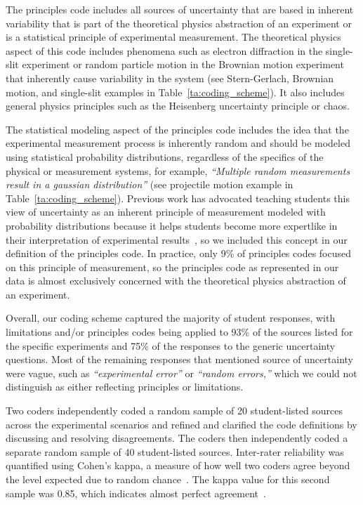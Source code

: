 \documentclass[english,aps,prstper,reprint,showpacs,longbibliography,superscriptaddress,nofootinbib]{revtex4-2}
\begin{document}
The principles code includes all sources of uncertainty that are based in inherent variability that is part of the theoretical physics abstraction of an experiment or is a statistical principle of experimental measurement. The theoretical physics aspect of this code includes phenomena such as electron diffraction in the single-slit experiment or random particle motion in the Brownian motion experiment that inherently cause variability in the system (see Stern-Gerlach, Brownian motion, and single-slit examples in Table~\ref{ta:coding_scheme}). It also includes general physics principles such as the Heisenberg uncertainty principle or chaos. 

The statistical modeling aspect of the principles code includes the idea that the experimental measurement process is inherently random and should be modeled using statistical probability distributions, regardless of the specifics of the physical or measurement systems, for example, \textit{``Multiple random measurements result in a gaussian distribution''} (see projectile motion example in Table~\ref{ta:coding_scheme}). Previous work has advocated teaching students this view of uncertainty as an inherent principle of measurement modeled with probability distributions because it helps students become more expertlike in their interpretation of experimental results~\cite{Evangelinos1999,Evangelinos2002,Allie2003,Pillay2008,Buffler2008}, so we included this concept in our definition of the principles code. In practice, only 9\% of principles codes focused on this principle of measurement, so the principles code as represented in our data is almost exclusively concerned with the theoretical physics abstraction of an experiment.

Overall, our coding scheme captured the majority of student responses, with limitations and/or principles codes being applied to 93\% of the sources listed for the specific experiments and 75\% of the responses to the generic uncertainty questions. Most of the remaining responses that mentioned source of uncertainty were vague, such as \textit{``experimental error''} or \textit{``random errors,''} which we could not distinguish as either reflecting principles or limitations. 

Two coders independently coded a random sample of 20 student-listed sources across the experimental scenarios and refined and clarified the code definitions by discussing and resolving disagreements. The coders then independently coded a separate random sample of 40 student-listed sources. Inter-rater reliability was quantified using Cohen's kappa, a measure of how well two coders agree beyond the level expected due to random chance~\cite{Cohen1960}. The kappa value for this second sample was 0.85, which indicates almost perfect agreement~\cite{Landis1977}. 
\end{document}
